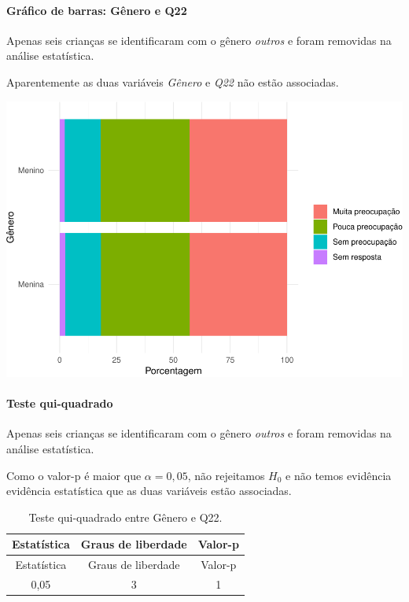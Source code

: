 \documentclass[]{article}
\let\oldparagraph\paragraph
\renewcommand{\paragraph}[1]{\oldparagraph{#1}\mbox{}}
\begin{document}
\hypertarget{gruxe1fico-de-barras-guxeanero-e-q22}{%
\paragraph{Gráfico de barras: Gênero e Q22}\label{gruxe1fico-de-barras-guxeanero-e-q22}}

Apenas seis crianças se identificaram com o gênero \emph{outros} e foram removidas na análise estatística.

Aparentemente as duas variáveis \emph{Gênero} e \emph{Q22} não estão associadas.

\begin{center}\includegraphics[width=0.75\linewidth]{relatorio_files/figure-latex/unnamed-chunk-372-1} \end{center}

\hypertarget{teste-qui-quadrado-43}{%
\paragraph{Teste qui-quadrado}\label{teste-qui-quadrado-43}}

Apenas seis crianças se identificaram com o gênero \emph{outros} e foram removidas na análise estatística.

Como o valor-p é maior que \(\alpha=0,05\), não rejeitamos \(H_0\) e não temos evidência evidência estatística que as duas variáveis estão associadas.

\begin{longtable}[]{@{}ccc@{}}
\caption{\label{tab:unnamed-chunk-373}Teste qui-quadrado entre Gênero e Q22.}\tabularnewline
\toprule
Estatística & Graus de liberdade & Valor-p\tabularnewline
\midrule
\endfirsthead
\toprule
Estatística & Graus de liberdade & Valor-p\tabularnewline
\midrule
\endhead
0,05 & 3 & 1\tabularnewline
\bottomrule
\end{longtable}
\end{document}
